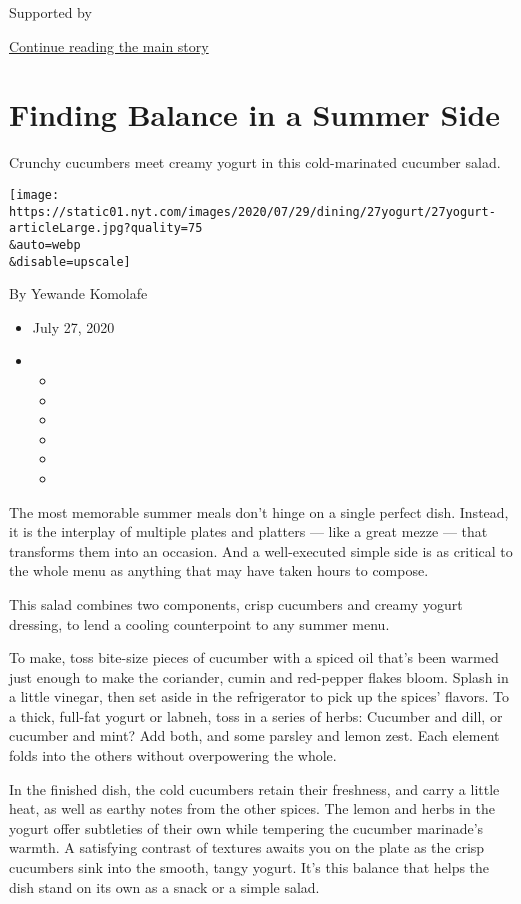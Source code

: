 Supported by

\protect\hyperlink{after-sponsor}{Continue reading the main story}

\hypertarget{finding-balance-in-a-summer-side}{%
\section{Finding Balance in a Summer
Side}\label{finding-balance-in-a-summer-side}}

Crunchy cucumbers meet creamy yogurt in this cold-marinated cucumber
salad.

\texttt{[image: https://static01.nyt.com/images/2020/07/29/dining/27yogurt/27yogurt-articleLarge.jpg?quality=75\\\&auto=webp\\\&disable=upscale]}

By Yewande Komolafe

\begin{itemize}
\item
  July 27, 2020
\item
  \begin{itemize}
  \item
  \item
  \item
  \item
  \item
  \item
  \end{itemize}
\end{itemize}

The most memorable summer meals don't hinge on a single perfect dish.
Instead, it is the interplay of multiple plates and platters --- like a
great mezze --- that transforms them into an occasion. And a
well-executed simple side is as critical to the whole menu as anything
that may have taken hours to compose.

This salad combines two components, crisp cucumbers and creamy yogurt
dressing, to lend a cooling counterpoint to any summer menu.

To make, toss bite-size pieces of cucumber with a spiced oil that's been
warmed just enough to make the coriander, cumin and red-pepper flakes
bloom. Splash in a little vinegar, then set aside in the refrigerator to
pick up the spices' flavors. To a thick, full-fat yogurt or labneh, toss
in a series of herbs: Cucumber and dill, or cucumber and mint? Add both,
and some parsley and lemon zest. Each element folds into the others
without overpowering the whole.

In the finished dish, the cold cucumbers retain their freshness, and
carry a little heat, as well as earthy notes from the other spices. The
lemon and herbs in the yogurt offer subtleties of their own while
tempering the cucumber marinade's warmth. A satisfying contrast of
textures awaits you on the plate as the crisp cucumbers sink into the
smooth, tangy yogurt. It's this balance that helps the dish stand on its
own as a snack or a simple salad.

